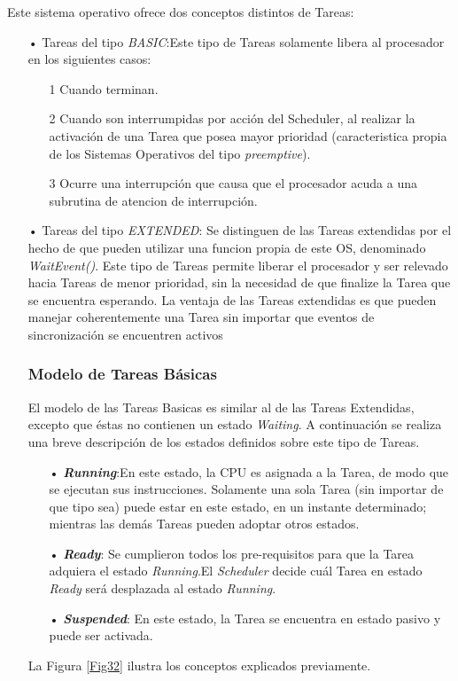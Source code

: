 \documentclass[12pt,letterpaper]{article}
\begin{document}
Este sistema operativo ofrece dos conceptos distintos de Tareas\cite{os223}:
\begin{enumerate}
\item[•]Tareas del tipo \emph{BASIC}:Este tipo de Tareas solamente libera al procesador en los siguientes casos:
\begin{enumerate}
\item[1]Cuando terminan.
\item[2]Cuando son interrumpidas por acción del Scheduler, al realizar la activación de una Tarea que posea mayor prioridad (caracteristica propia de los Sistemas Operativos del tipo \textit{preemptive}).
\item[3]Ocurre una interrupción que causa que el procesador acuda a una subrutina de atencion de interrupción.
\end{enumerate}
\item[•]Tareas del tipo \emph{EXTENDED}: Se distinguen de las Tareas extendidas por el hecho de que pueden utilizar una funcion propia de este OS, denominado \textit{WaitEvent()}. Este tipo de Tareas permite liberar el procesador y ser relevado hacia Tareas de menor prioridad, sin la necesidad de que finalize la Tarea que se encuentra esperando.
La ventaja de las Tareas extendidas es que pueden manejar coherentemente una Tarea sin importar que eventos de sincronización se encuentren activos%
\subsubsection{Modelo de Tareas Básicas}
El modelo de las Tareas Basicas es similar al de las Tareas Extendidas, excepto que éstas no contienen un estado \textit{Waiting}. A continuación se realiza una breve descripción de los estados definidos sobre este tipo de Tareas.
\begin{enumerate}
\item[•]\textbf{\emph{Running}}:En este estado, la CPU es asignada a la Tarea, de modo que se ejecutan sus instrucciones. Solamente una sola Tarea (sin importar de que tipo sea) puede estar en este estado, en un instante determinado; mientras las demás Tareas pueden adoptar otros estados.
\item[•]\textbf{\emph{Ready}}: Se cumplieron todos los pre-requisitos para que la Tarea adquiera el estado \textit{Running}.El \textit{Scheduler} decide cuál Tarea en estado \textit{Ready} será desplazada al estado \textit{Running}.
\item[•]\textbf{\emph{Suspended}}: En este estado, la Tarea se encuentra en estado pasivo y puede ser activada.
\end{enumerate}
La Figura \ref{Fig32} ilustra los conceptos explicados previamente.


\end{enumerate}
\end{document}
